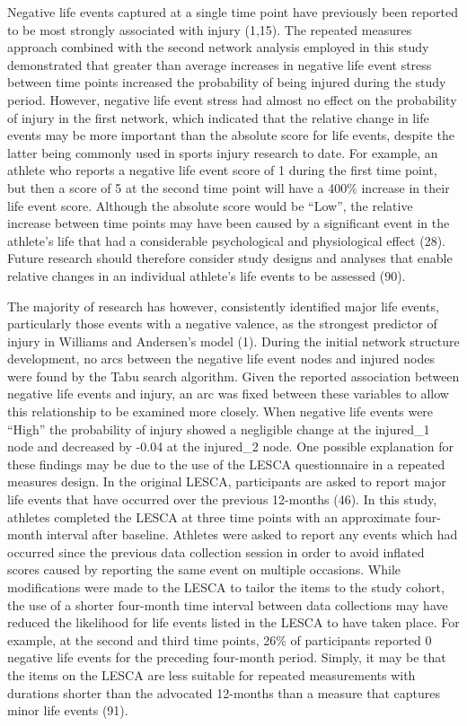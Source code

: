 \documentclass[
  english,
  man]{apa6}
\begin{document}
Negative life events captured at a single time point have previously been reported to be most strongly associated with injury (1,15).
The repeated measures approach combined with the second network analysis employed in this study demonstrated that greater than average increases in negative life event stress between time points increased the probability of being injured during the study period.
However, negative life event stress had almost no effect on the probability of injury in the first network, which indicated that the relative change in life events may be more important than the absolute score for life events, despite the latter being commonly used in sports injury research to date.
For example, an athlete who reports a negative life event score of 1 during the first time point, but then a score of 5 at the second time point will have a 400\% increase in their life event score.
Although the absolute score would be ``Low'', the relative increase between time points may have been caused by a significant event in the athlete's life that had a considerable psychological and physiological effect (28).
Future research should therefore consider study designs and analyses that enable relative changes in an individual athlete's life events to be assessed (90).

The majority of research has however, consistently identified major life events, particularly those events with a negative valence, as the strongest predictor of injury in Williams and Andersen's model (1).
During the initial network structure development, no arcs between the negative life event nodes and injured nodes were found by the Tabu search algorithm.
Given the reported association between negative life events and injury, an arc was fixed between these variables to allow this relationship to be examined more closely.
When negative life events were ``High'' the probability of injury showed a negligible change at the injured\_1 node and decreased by -0.04 at the injured\_2 node.
One possible explanation for these findings may be due to the use of the LESCA questionnaire in a repeated measures design.
In the original LESCA, participants are asked to report major life events that have occurred over the previous 12-months (46).
In this study, athletes completed the LESCA at three time points with an approximate four-month interval after baseline.
Athletes were asked to report any events which had occurred since the previous data collection session in order to avoid inflated scores caused by reporting the same event on multiple occasions.
While modifications were made to the LESCA to tailor the items to the study cohort, the use of a shorter four-month time interval between data collections may have reduced the likelihood for life events listed in the LESCA to have taken place.
For example, at the second and third time points, 26\% of participants reported 0 negative life events for the preceding four-month period.
Simply, it may be that the items on the LESCA are less suitable for repeated measurements with durations shorter than the advocated 12-months than a measure that captures minor life events (91).
\end{document}
